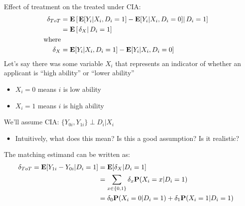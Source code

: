 \documentclass[compress, 8pt]{beamer}
\begin{document}
\begin{frame}{}

Effect of treatment on the treated under CIA: 
\begin{align*}
    \delta_{ToT} &= \mathbf{E} \left[ \left.
            {\mathbf{E} [Y_{i} \vert X_i, D_i=1]}
            - {\mathbf{E} [Y_{i} \vert X_i, D_i=0]}        
            \right\vert D_i = 1
        \right] \\
        &= \mathbf{E} \left[ \left. 
            \delta_X
        \right\vert D_i = 1\right] \\
    \text{where} & \\
        \delta_X &= {\mathbf{E} [Y_{i} \vert X_i, D_i=1]}
            - {\mathbf{E} [Y_{i} \vert X_i, D_i=0]}
\end{align*}
Let's say there was some variable $X_i$ that represents an indicator of whether an applicant is ``high ability'' or ``lower ability''
\begin{itemize}
    \item $X_i = 0$ means $i$ is low ability 
    \item $X_i = 1$ means $i$ is high ability
\end{itemize}
We'll assume CIA: $\{Y_{0i}, Y_{1i}\} \perp D_i \vert X_i$ 
\begin{itemize}
    \item Intuitively, what does this mean? Is this a good assumption? Is it realistic?
\end{itemize}

The matching estimand can be written as:
\begin{align*}
    \delta_{ToT} = \mathbf{E} [Y_{1i} - Y_{0i} \vert D_i = 1] &= \mathbf{E} [\delta_X \vert D_i = 1] \\
    &= \sum_{x \in \{0, 1\}} \delta_x \mathbf{P}(X_i = x \vert D_i = 1 ) \\
    &= \delta_0 \mathbf{P} (X_i = 0 \vert D_i = 1)
    + \delta_1 \mathbf{P} (X_i = 1 \vert D_i = 1)
\end{align*}
\end{frame}
\end{document}

